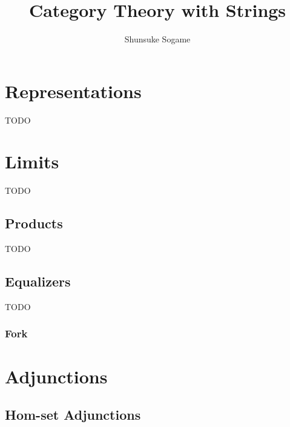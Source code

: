 \documentclass{article}
\title{Category Theory with Strings}
\author{Shunsuke Sogame}
\begin{document}
\maketitle











\section{Representations}
TODO

\section{Limits}
TODO

\subsection{Products}
TODO

\subsection{Equalizers}
TODO
\subsubsection{Fork}

\section{Adjunctions}

\subsection{Hom-set Adjunctions}
\end{document}
